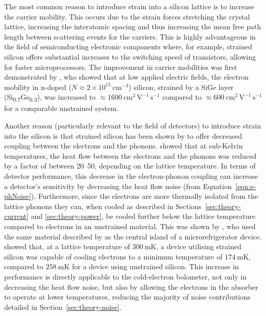 \par 
The most common reason to introduce strain into a silicon lattice is to increase the carrier mobility. This occurs due to the strain forces stretching the crystal lattice, increasing the interatomic spacing and thus increasing the mean free path length between scattering events for the carriers. This is highly advantageous in the field of semiconducting electronic components where, for example, strained silicon offers substantial increases to the switching speed of transistors, allowing for faster microprocessors. The improvement in carrier mobilities was first demonstrated by \textcite{Welser1994}, who showed that at low applied electric fields, the electron mobility in n-doped ($N \approx 2 \times 10^{15}~\mathrm{cm^{-3}}$) silicon, strained by a SiGe layer (Si\textsubscript{0.7}Ge\textsubscript{0.3}), was increased to $\approx 1600~\mathrm{cm^{2}\,V^{-1}\,s^{-1}}$ compared to $\approx 600~\mathrm{cm^{2}\,V^{-1}\,s^{-1}}$ for a comparable unstrained system.
\par 
Another reason (particularly relevant to the field of detectors) to introduce strain into the silicon is that strained silicon has been shown by \textcite{Muhonen2011} to offer decreased coupling between the electrons and the phonons. \citeauthor{Muhonen2011} showed that at sub-Kelvin temperatures, the heat flow between the electrons and the phonons was reduced by a factor of between 20--50, depending on the lattice temperature. In terms of detector performance, this decrease in the electron-phonon coupling can increase a detector's sensitivity by decreasing the heat flow noise (from Equation~\ref{eqn:e-phNoise}). Furthermore, since the electrons are more thermally isolated from the lattice phonons they can, when cooled as described in Sections~\ref{sec:theory-current} and \ref{sec:theory-power}, be cooled further below the lattice temperature compared to electrons in an unstrained material. This was shown by \textcite{Prest2011}, who used the same material described by \textcite{Muhonen2011} as the central island of a microrefrigerator device. \citeauthor{Prest2011} showed that, at a lattice temperature of $300~\mathrm{mK}$, a device utilising strained silicon was capable of cooling electrons to a minimum temperature of $174~\mathrm{mK}$, compared to $258~\mathrm{mK}$ for a device using unstrained silicon. This increase in performance is directly applicable to the cold-electron bolometer, not only in decreasing the heat flow noise, but also by allowing the electrons in the absorber to operate at lower temperatures, reducing the majority of noise contributions detailed in Section~\ref{sec:theory-noise}.
